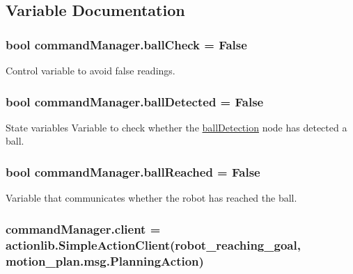 \subsection{Variable Documentation}
\subsubsection[{\texorpdfstring{ball\+Check}{ballCheck}}]{\setlength{\rightskip}{0pt plus 5cm}bool command\+Manager.\+ball\+Check = False}\hypertarget{namespacecommandManager_a98d638b22b400e4c4bce2f95e8f69363}{}\label{namespacecommandManager_a98d638b22b400e4c4bce2f95e8f69363}


Control variable to avoid false readings. 

\subsubsection[{\texorpdfstring{ball\+Detected}{ballDetected}}]{\setlength{\rightskip}{0pt plus 5cm}bool command\+Manager.\+ball\+Detected = False}\hypertarget{namespacecommandManager_a4ed98b9d98c0860f84ddfa04bb3c5930}{}\label{namespacecommandManager_a4ed98b9d98c0860f84ddfa04bb3c5930}


State variables Variable to check whether the \hyperlink{namespaceballDetection}{ball\+Detection} node has detected a ball. 

\subsubsection[{\texorpdfstring{ball\+Reached}{ballReached}}]{\setlength{\rightskip}{0pt plus 5cm}bool command\+Manager.\+ball\+Reached = False}\hypertarget{namespacecommandManager_a2addbd14eb79fa7c8751337f7a27067b}{}\label{namespacecommandManager_a2addbd14eb79fa7c8751337f7a27067b}


Variable that communicates whether the robot has reached the ball. 

\subsubsection[{\texorpdfstring{client}{client}}]{\setlength{\rightskip}{0pt plus 5cm}command\+Manager.\+client = actionlib.\+Simple\+Action\+Client(\textquotesingle{}robot\+\_\+reaching\+\_\+goal\textquotesingle{}, motion\+\_\+plan.\+msg.\+Planning\+Action)}\hypertarget{namespacecommandManager_ad81f5cdd9bf18b67989c77a2329b9e28}{}\label{namespacecommandManager_ad81f5cdd9bf18b67989c77a2329b9e28}


